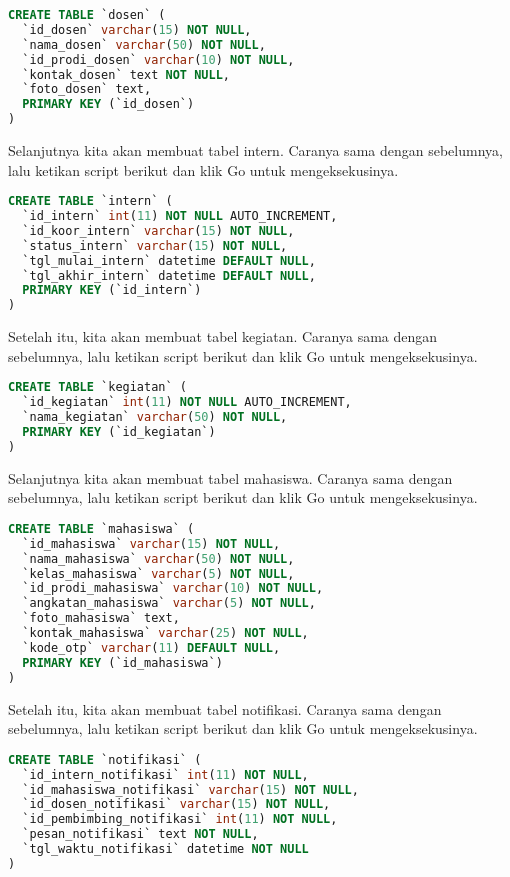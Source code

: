 \begin{lstlisting}[language=SQL]
CREATE TABLE `dosen` (
  `id_dosen` varchar(15) NOT NULL,
  `nama_dosen` varchar(50) NOT NULL,
  `id_prodi_dosen` varchar(10) NOT NULL,
  `kontak_dosen` text NOT NULL,
  `foto_dosen` text,
  PRIMARY KEY (`id_dosen`)
)
\end{lstlisting}

\noindent
Selanjutnya kita akan membuat tabel intern. Caranya sama dengan sebelumnya, lalu ketikan script berikut dan klik Go untuk mengeksekusinya.

\begin{lstlisting}[language=SQL]
CREATE TABLE `intern` (
  `id_intern` int(11) NOT NULL AUTO_INCREMENT,
  `id_koor_intern` varchar(15) NOT NULL,
  `status_intern` varchar(15) NOT NULL,
  `tgl_mulai_intern` datetime DEFAULT NULL,
  `tgl_akhir_intern` datetime DEFAULT NULL,
  PRIMARY KEY (`id_intern`)
)
\end{lstlisting}

\noindent
Setelah itu, kita akan membuat tabel kegiatan. Caranya sama dengan sebelumnya, lalu ketikan script berikut dan klik Go untuk mengeksekusinya.

\begin{lstlisting}[language=SQL]
CREATE TABLE `kegiatan` (
  `id_kegiatan` int(11) NOT NULL AUTO_INCREMENT,
  `nama_kegiatan` varchar(50) NOT NULL,
  PRIMARY KEY (`id_kegiatan`)
)
\end{lstlisting}

\noindent
Selanjutnya kita akan membuat tabel mahasiswa. Caranya sama dengan sebelumnya, lalu ketikan script berikut dan klik Go untuk mengeksekusinya.

\begin{lstlisting}[language=SQL]
CREATE TABLE `mahasiswa` (
  `id_mahasiswa` varchar(15) NOT NULL,
  `nama_mahasiswa` varchar(50) NOT NULL,
  `kelas_mahasiswa` varchar(5) NOT NULL,
  `id_prodi_mahasiswa` varchar(10) NOT NULL,
  `angkatan_mahasiswa` varchar(5) NOT NULL,
  `foto_mahasiswa` text,
  `kontak_mahasiswa` varchar(25) NOT NULL,
  `kode_otp` varchar(11) DEFAULT NULL,
  PRIMARY KEY (`id_mahasiswa`)
)
\end{lstlisting}

\noindent
Setelah itu, kita akan membuat tabel notifikasi. Caranya sama dengan sebelumnya, lalu ketikan script berikut dan klik Go untuk mengeksekusinya.

\begin{lstlisting}[language=SQL]
CREATE TABLE `notifikasi` (
  `id_intern_notifikasi` int(11) NOT NULL,
  `id_mahasiswa_notifikasi` varchar(15) NOT NULL,
  `id_dosen_notifikasi` varchar(15) NOT NULL,
  `id_pembimbing_notifikasi` int(11) NOT NULL,
  `pesan_notifikasi` text NOT NULL,
  `tgl_waktu_notifikasi` datetime NOT NULL
)
\end{lstlisting}

